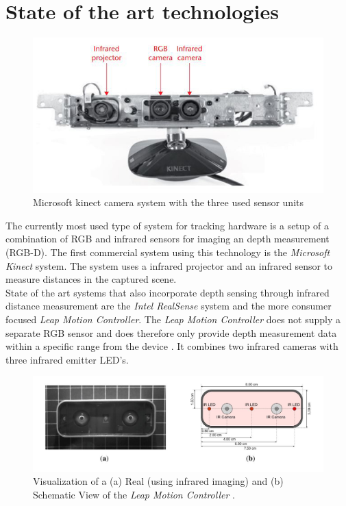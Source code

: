 \section{State of the art technologies}
\label{sec:state_of_the_art}
\begin{figure}
\label{img:kinect}
\includegraphics[width=\textwidth/2]{images/kinnect.JPG} 
\caption{Microsoft kinect camera system with the three used sensor units \cite{Zhang.2012}}
\end{figure}
The currently most used type of system for tracking hardware is a setup of a combination of RGB and infrared sensors for imaging an depth measurement (RGB-D). The first commercial system using this technology is the \textit{ Microsoft Kinect} system\cite{Zhang.2012}. The system uses a infrared projector and an infrared sensor to measure distances in the captured scene.\\
State of the art systems that also incorporate depth sensing through infrared distance measurement are the \textit{Intel RealSense} system and the more consumer focused \textit{Leap Motion Controller}. The\textit{ Leap Motion Controller} does not supply a separate RGB sensor and does therefore only provide depth measurement data within a specific range from the device \cite{Weichert.2013}. It combines two infrared cameras with three infrared emitter LED's.
\begin{figure}[H]
\includegraphics[width=\textwidth]{images/leapMotion.JPG}
\caption{Visualization of a (a) Real (using infrared imaging) and (b) Schematic View of the \textit{Leap Motion Controller} \cite{Weichert.2013}.}
\label{img:leapMotion} 
\end{figure}
